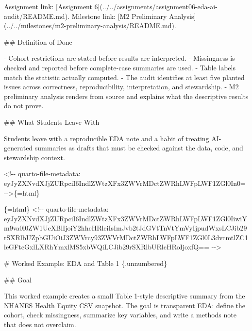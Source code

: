 \documentclass[
  letterpaper,
  DIV=11,
  numbers=noendperiod,
  oneside]{scrreprt}
\newenvironment{Shaded}{\begin{snugshade}}{\end{snugshade}}
\newcommand{\CommentTok}[1]{\textcolor[rgb]{0.37,0.37,0.37}{#1}}
\newcommand{\FunctionTok}[1]{\textcolor[rgb]{0.28,0.35,0.67}{#1}}
\newcommand{\InformationTok}[1]{\textcolor[rgb]{0.37,0.37,0.37}{#1}}
\newcommand{\NormalTok}[1]{\textcolor[rgb]{0.00,0.23,0.31}{#1}}
\newcommand{\OtherTok}[1]{\textcolor[rgb]{0.00,0.23,0.31}{#1}}
\newcommand{\SpecialStringTok}[1]{\textcolor[rgb]{0.13,0.47,0.30}{#1}}
\begin{document}
\begin{Shaded}
\begin{Highlighting}[numbers=left,,]
\NormalTok{Assignment link: }\CommentTok{[}\OtherTok{Assignment 6}\CommentTok{](../../assignments/assignment06{-}eda{-}ai{-}audit/README.md)}\NormalTok{. Milestone link: }\CommentTok{[}\OtherTok{M2 Preliminary Analysis}\CommentTok{](../../milestones/m2{-}preliminary{-}analysis/README.md)}\NormalTok{.}

\FunctionTok{\#\# Definition of Done}

\SpecialStringTok{{-} }\NormalTok{Cohort restrictions are stated before results are interpreted.}
\SpecialStringTok{{-} }\NormalTok{Missingness is checked and reported before complete{-}case summaries are used.}
\SpecialStringTok{{-} }\NormalTok{Table labels match the statistic actually computed.}
\SpecialStringTok{{-} }\NormalTok{The audit identifies at least five planted issues across correctness, reproducibility, interpretation, and stewardship.}
\SpecialStringTok{{-} }\NormalTok{M2 preliminary analysis renders from source and explains what the descriptive results do not prove.}

\FunctionTok{\#\# What Students Leave With}

\NormalTok{Students leave with a reproducible EDA note and a habit of treating AI{-}generated summaries as drafts that must be checked against the data, code, and stewardship context.}


\InformationTok{\textasciigrave{}\textless{}!{-}{-} quarto{-}file{-}metadata: eyJyZXNvdXJjZURpciI6IndlZWtzXFx3ZWVrMDctZWRhLWFpLWF1ZGl0In0= {-}{-}\textgreater{}\textasciigrave{}}\NormalTok{\{=html\}}

\InformationTok{\textasciigrave{}\textasciigrave{}\textasciigrave{}\{=html\}}
\InformationTok{\textless{}!{-}{-} quarto{-}file{-}metadata: eyJyZXNvdXJjZURpciI6IndlZWtzXFx3ZWVrMDctZWRhLWFpLWF1ZGl0IiwiYm9va0l0ZW1UeXBlIjoiY2hhcHRlciIsImJvb2tJdGVtTnVtYmVyIjpudWxsLCJib29rSXRlbUZpbGUiOiJ3ZWVrcy93ZWVrMDctZWRhLWFpLWF1ZGl0L3dvcmtlZC1leGFtcGxlLXRhYmxlMS5xbWQiLCJib29rSXRlbURlcHRoIjoxfQ== {-}{-}\textgreater{}}
\InformationTok{\textasciigrave{}\textasciigrave{}\textasciigrave{}}

\FunctionTok{\# Worked Example: EDA and Table 1 \{.unnumbered\}}


\FunctionTok{\#\# Goal}

\NormalTok{This worked example creates a small Table 1{-}style descriptive summary from the NHANES Health Equity CSV snapshot. The goal is transparent EDA: define the cohort, check missingness, summarize key variables, and write a methods note that does not overclaim.}



\end{Highlighting}
\end{Shaded}
\end{document}
